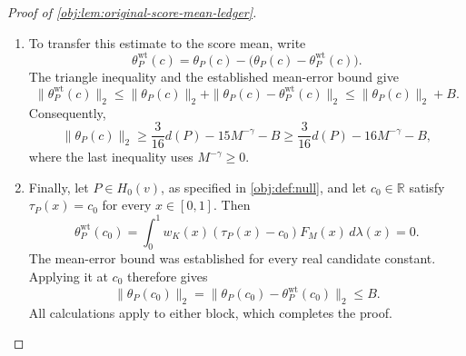 \begin{proof}[Proof of \cref{obj:lem:original-score-mean-ledger}]
\begin{enumerate}
\item
To transfer this estimate to the score mean, write
\[
\theta^{\mathrm{wt}}_P(c)
=
\theta_P(c)-\bigl(\theta_P(c)-\theta^{\mathrm{wt}}_P(c)\bigr).
\]
The triangle inequality and the established mean-error bound give
\[
\|\theta^{\mathrm{wt}}_P(c)\|_2
\le
\|\theta_P(c)\|_2
+\|\theta_P(c)-\theta^{\mathrm{wt}}_P(c)\|_2
\le
\|\theta_P(c)\|_2+B.
\]
Consequently,
\[
\|\theta_P(c)\|_2
\ge\frac3{16}d(P)-15M^{-\gamma}-B
\ge\frac3{16}d(P)-16M^{-\gamma}-B,
\]
where the last inequality uses \(M^{-\gamma}\ge0\).

\item
Finally, let \(P\in H_0(v)\), as specified in
\cref{obj:def:null}, and let \(c_0\in\mathbb R\) satisfy
\(\tau_P(x)=c_0\) for every \(x\in[0,1]\). Then
\[
\theta^{\mathrm{wt}}_P(c_0)
=
\int_0^1w_K(x)(\tau_P(x)-c_0)F_M(x)\,d\lambda(x)
=0.
\]
The mean-error bound was established for every real candidate constant. Applying it at \(c_0\) therefore gives
\[
\|\theta_P(c_0)\|_2
=
\|\theta_P(c_0)-\theta^{\mathrm{wt}}_P(c_0)\|_2
\le B.
\]
All calculations apply to either block, which completes the proof.
\end{enumerate}
\end{proof}
